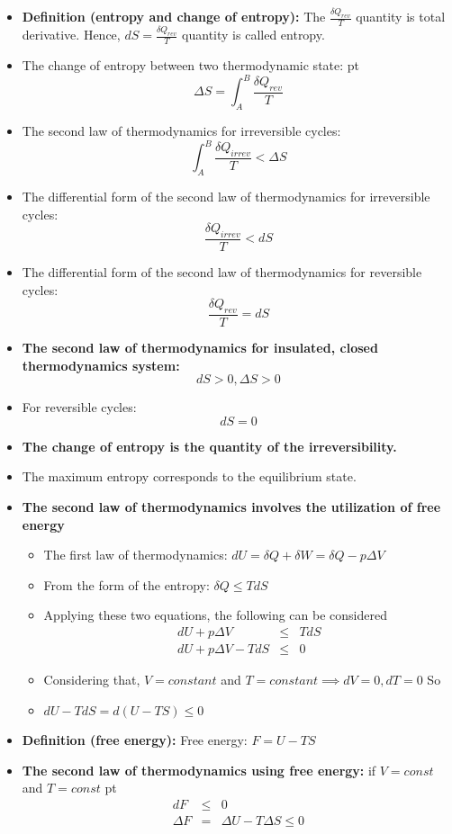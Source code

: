 \documentclass[t,aspectratio=169]{beamer}
\begin{document}
\begin{frame}
\begin{itemize}
\pagebreak
\item \textbf{Definition (entropy and change of entropy):} The $\frac{\delta Q_{rev}}{T}$ quantity is total derivative. Hence, $dS = \frac{\delta Q_{rev}}{T}$ quantity is called entropy.

\item The change of entropy between two thermodynamic state:
 pt
  $$\Delta S = \int_A^B \frac{\delta Q_{rev}}{T}$$
\item The second law of thermodynamics for irreversible cycles: $$\int_A^B \frac{\delta Q_{irrev}}{T} < \Delta S$$
\item The differential form of the second law of thermodynamics for irreversible cycles: $$\frac{\delta Q_{irrev}}{T} < dS$$

\pagebreak
\item The differential form of the second law of thermodynamics for reversible cycles: $$\frac{\delta Q_{rev}}{T} = dS$$
\item \textbf{The second law of thermodynamics for insulated, closed thermodynamics system: $$dS > 0, \Delta S > 0$$}
\item For reversible cycles: $$dS = 0$$
\item \textbf{The change of entropy is the quantity of the irreversibility.}
\item The maximum entropy corresponds to the equilibrium state.

\pagebreak
\item \textbf{The second law of thermodynamics involves the utilization of free energy}
\begin{itemize}
\item The first law of thermodynamics: $dU = \delta Q + \delta W = \delta Q - p \Delta V$
\item From the form of the entropy: $\delta Q \leq T dS$
\item Applying these two equations, the following can be considered
\begin{eqnarray*}
  dU + p \Delta V &\leq& T dS \\
  dU + p \Delta V - T dS & \leq & 0
\end{eqnarray*}
\item Considering that, $V = constant$ and $T = constant \implies dV = 0, dT = 0$ So 
\item $dU - T dS = d(U - TS) \leq 0$
\end{itemize}
\item \textbf{Definition (free energy):} Free energy: $F = U - TS$
\item \textbf{The second law of thermodynamics using free energy:} if $V = const$ and $T = const$
 pt
\begin{eqnarray*}
  dF &\leq& 0 \\
  \Delta F &=& \Delta U - T \Delta S \leq 0
\end{eqnarray*}


\end{itemize}
\end{frame}
\end{document}
